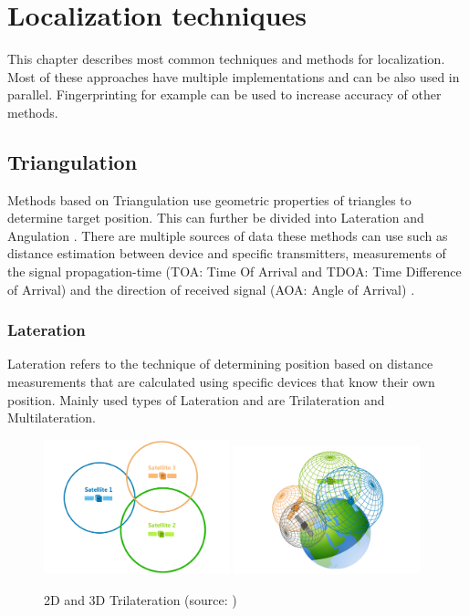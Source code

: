\chapter{Localization techniques}\label{sec:LocalizationTechniques}
This chapter describes most common techniques and methods for localization. Most of these approaches have multiple implementations and can be also used in parallel. Fingerprinting for example can be used to increase accuracy of other methods.

\section{Triangulation}\label{sec:Triangulation}
Methods based on Triangulation use geometric properties of triangles to determine target position. This can further be divided into Lateration and Angulation \cite{RAinWILTaS}. There are multiple sources of data these methods can use such as distance estimation between device and specific transmitters, measurements of the signal propagation-time (TOA: Time Of Arrival and TDOA: Time Difference of Arrival\cite{LTinWSN}) and the direction of received
signal (AOA: Angle of Arrival\cite{AoALforWSN}) \cite{IILUBLEB}.

\subsection{Lateration}\label{sec:Lateration}
Lateration refers to the technique of determining position based on distance measurements that are calculated using specific devices that know their own position.  Mainly used types of Lateration and are Trilateration and Multilateration. 

\begin{figure}[h!]
	\begin{centering}
		\includegraphics[width=0.48\textwidth]{img/trilateration_2d}
		\includegraphics[width=0.48\textwidth]{img/trilateration_3d}
		\par\end{centering}
	\caption{2D and 3D Trilateration (source: \cite{TvTHGPSRW})\label{fig:2d_and_3d_trilateration}}
	\label{fig01c02}
\end{figure}

